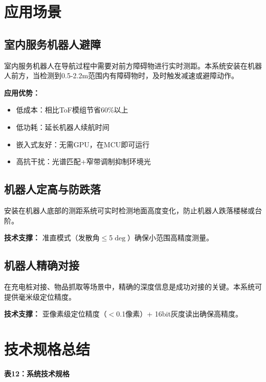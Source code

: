 \documentclass[12pt, a4paper]{ctexart}
\begin{document}
\section{应用场景}

\subsection{室内服务机器人避障}

室内服务机器人在导航过程中需要对前方障碍物进行实时测距。本系统安装在机器人前方，当检测到0.5-2.2m范围内有障碍物时，及时触发减速或避障动作。

\textbf{应用优势：}
\begin{itemize}
\item 低成本：相比ToF模组节省60\%以上
\item 低功耗：延长机器人续航时间
\item 嵌入式友好：无需GPU，在MCU即可运行
\item 高抗干扰：光谱匹配+窄带调制抑制环境光
\end{itemize}

\subsection{机器人定高与防跌落}

安装在机器人底部的测距系统可实时检测地面高度变化，防止机器人跌落楼梯或台阶。

\textbf{技术支撑：} 准直模式（发散角$\le$5$\deg$）确保小范围高精度测量。

\subsection{机器人精确对接}

在充电桩对接、物品抓取等场景中，精确的深度信息是成功对接的关键。本系统可提供毫米级定位精度。

\textbf{技术支撑：} 亚像素级定位精度（$<$0.1像素）+ 16bit灰度读出确保高精度。

\section{技术规格总结}

\textbf{表12：系统技术规格}
\end{document}

